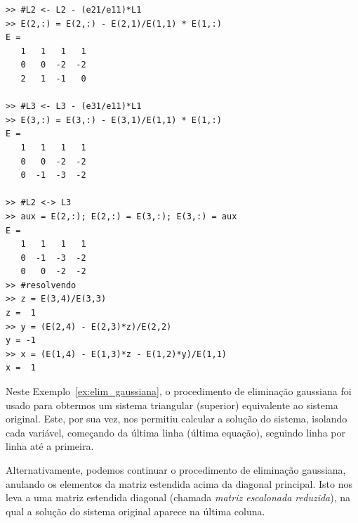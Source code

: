 \begin{sol}
\begin{verbatim}
>> #L2 <- L2 - (e21/e11)*L1
>> E(2,:) = E(2,:) - E(2,1)/E(1,1) * E(1,:)
E =
   1   1   1   1
   0   0  -2  -2
   2   1  -1   0

>> #L3 <- L3 - (e31/e11)*L1
>> E(3,:) = E(3,:) - E(3,1)/E(1,1) * E(1,:)
E =
   1   1   1   1
   0   0  -2  -2
   0  -1  -3  -2

>> #L2 <-> L3
>> aux = E(2,:); E(2,:) = E(3,:); E(3,:) = aux
E =
   1   1   1   1
   0  -1  -3  -2
   0   0  -2  -2
>> #resolvendo
>> z = E(3,4)/E(3,3)
z =  1
>> y = (E(2,4) - E(2,3)*z)/E(2,2)
y = -1
>> x = (E(1,4) - E(1,3)*z - E(1,2)*y)/E(1,1)
x =  1
\end{verbatim}
\fi
\end{sol}

Neste Exemplo~\ref{ex:elim_gaussiana}, o procedimento de eliminação gaussiana foi usado para obtermos um sistema triangular (superior) equivalente ao sistema original. Este, por sua vez, nos permitiu calcular a solução do sistema, isolando cada variável, começando da última linha (última equação), seguindo linha por linha até a primeira.

Alternativamente, podemos continuar o procedimento de eliminação gaussiana, anulando os elementos da matriz estendida acima da diagonal principal. Isto nos leva a uma matriz estendida diagonal (chamada \emph{matriz escalonada reduzida}), na qual a solução do sistema original aparece na última coluna.

